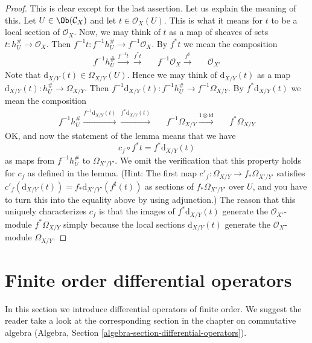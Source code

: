 \begin{proof}
This is clear except for the last assertion. Let us explain the meaning of
this. Let $U \in \Ob(\mathcal{C}_X)$ and let $t \in \mathcal{O}_X(U)$.
This is what it means for $t$ to be a local section of $\mathcal{O}_X$.
Now, we may think of $t$ as a map of sheaves of sets
$t : h_U^\# \to \mathcal{O}_X$. Then
$f^{-1}t : f^{-1}h_U^\# \to f^{-1}\mathcal{O}_X$. By $f^*t$ we mean
the composition
$$
\begin{array}{ccccc}f^{-1}h_U^\# \overset{f^{-1}t}{\longrightarrow}\overset{f^*t}{\longrightarrow} &  & f^{-1}\mathcal{O}_X \overset{f^\sharp}{\longrightarrow} &  & \mathcal{O}_{X'}\end{array}
$$
Note that $\text{d}_{X/Y}(t) \in \Omega_{X/Y}(U)$. Hence we may think of
$\text{d}_{X/Y}(t)$ as a map $\text{d}_{X/Y}(t) : h_U^\# \to \Omega_{X/Y}$.
Then $f^{-1}\text{d}_{X/Y}(t) : f^{-1}h_U^\# \to f^{-1}\Omega_{X/Y}$.
By $f^*\text{d}_{X/Y}(t)$ we mean the composition
$$
\begin{array}{ccccc}f^{-1}h_U^\#
\overset{f^{-1}\text{d}_{X/Y}(t)}{\longrightarrow}\overset{f^*\text{d}_{X/Y}(t)}{\longrightarrow} &  & f^{-1}\Omega_{X/Y} \overset{1 \otimes \text{id}}{\longrightarrow} &  & f^*\Omega_{X/Y}\end{array}
$$
OK, and now the statement of the lemma means that we have
$$
c_f \circ f^*t = f^*\text{d}_{X/Y}(t)
$$
as maps from $f^{-1}h_U^\#$ to $\Omega_{X'/Y'}$. We omit the verification
that this property holds for $c_f$ as defined in the lemma. (Hint: The first
map $c'_f : \Omega_{X/Y} \to f_*\Omega_{X'/Y'}$ satisfies
$c'_f(\text{d}_{X/Y}(t)) = f_*\text{d}_{X'/Y'}(f^\sharp(t))$ as sections of
$f_*\Omega_{X'/Y'}$ over $U$, and you have to
turn this into the equality above by using adjunction.)
The reason that this uniquely characterizes $c_f$ is that the images
of $f^*\text{d}_{X/Y}(t)$ generate the $\mathcal{O}_{X'}$-module
$f^*\Omega_{X/Y}$ simply because the local sections $\text{d}_{X/Y}(t)$
generate the $\mathcal{O}_X$-module $\Omega_{X/Y}$.
\end{proof}

\section{Finite order differential operators}
\label{sites-modules-section-differential-operators}
In this section we introduce differential operators of finite order.
We suggest the reader take a look at the corresponding section
in the chapter on commutative algebra
(Algebra, Section \ref{algebra-section-differential-operators}).

